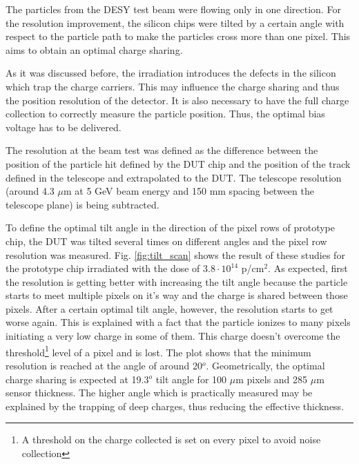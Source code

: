 The particles from the DESY test beam were flowing only in one direction. For the resolution improvement, the silicon chips were tilted by a certain 
angle with respect to the particle path to make the particles cross more than one pixel. This aims to obtain an optimal charge sharing.

As it was discussed before, the irradiation introduces the defects in the silicon which trap the charge carriers. This may influence the charge sharing
and thus the position resolution of the detector. It is also necessary to have the full charge collection to correctly measure the particle position.
Thus, the optimal bias voltage has to be delivered.

The resolution at the beam test was defined as the difference between the position of the particle hit defined by the DUT chip and the position of the
track defined in the telescope and extrapolated to the DUT. The telescope resolution (around 4.3 $\mu$m at 5 GeV beam energy and 150 mm spacing between
the telescope plane) is being subtracted.

To define the optimal tilt angle in the direction of the pixel rows of prototype chip, the DUT was tilted several times on different angles and the 
pixel row resolution was measured. Fig. \ref{fig:tilt_scan} shows the result of these studies for the prototype chip irradiated with the dose of
$3.8 \cdot 10^{14}$ p/cm$^2$. As expected, first the resolution is getting better with increasing the tilt angle because the particle starts to meet 
multiple pixels on it's way and the charge is shared between those pixels. After a certain optimal tilt angle, however, the resolution starts to get 
worse again. This is explained with a fact that the particle ionizes to many pixels initiating a very low charge in some of them. This charge doesn't
overcome the threshold\footnote{A threshold on the charge collected is set on every pixel to avoid noise collection} level of a pixel and is lost. 
The plot shows that the minimum resolution is reached at the angle of around 20$^{o}$. Geometrically, the optimal charge sharing is expected at 19.3$^{o}$
tilt angle for 100 $\mu$m pixels and 285 $\mu$m sensor thickness. The higher angle which is practically measured may be explained by the trapping
of deep charges, thus reducing the effective thickness.

